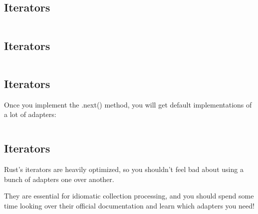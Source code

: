\documentclass[usenames,twocolumn,dvipsnames,10pt,a4wide]{article}
\begin{document}
	\inputminted[fontsize=\normalsize]{rust}{code/iterators3.rs}


\subsection{Iterators}
	\inputminted[fontsize=\normalsize]{rust}{code/iterators4.rs}


\subsection{Iterators}
	\inputminted[fontsize=\normalsize]{rust}{code/iterators5.rs}


\subsection{Iterators}
	Once you implement the .next() method, you will get default
	implementations of a lot of adapters:
	
	\inputminted[fontsize=\normalsize]{rust}{code/iterators6.rs}
	


\subsection{Iterators}
	Rust's iterators are heavily optimized, so you shouldn't
	feel bad about using a bunch of adapters one over another.
	
	They are essential for idiomatic collection processing,
	and you should spend some time looking over their official
	documentation and learn which adapters you need!


 
\end{document}
